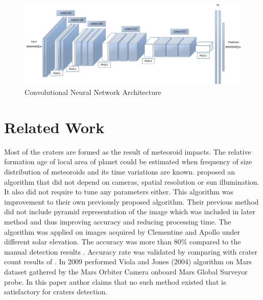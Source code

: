 \documentclass[11pt]{article}
\begin{document}
\begin{figure}[H]
	\centering
	\includegraphics[width=\linewidth]{files/cnn_architecture/arch.png}
	\caption{Convolutional Neural Network Architecture \cite{2016face}}
	\label{fig: CNN architecture}
\end{figure}




\section{Related Work}
Most of the craters are formed as the result of meteoroid impacts. The relative formation age of local area of planet could be estimated when frequency of size distribution of meteoroids and its time variations are known. \cite{sawabe_2006} proposed an algorithm that did not depend on cameras, spatial resolution or sun illumination. It also did not require to tune any parameters either. This algorithm was improvement to their own previously proposed algorithm. Their previous method did not include pyramid representation of the image which was included in later method and thus improving accuracy and reducing processing time. The algorithm was applied on images acquired by Clementine and Apollo under different solar elevation. The accuracy was more than 80\% compared to the manual detection results \cite{sawabe_2006}. Accuracy rate was validated by comparing with crater count results of \cite{neukum1975cratering}. In 2009 \cite{martins2009crater} performed Viola and Jones (2004) algorithm on Mars dataset gathered by the Mars Orbiter Camera onboard Mars Global Surveyor probe. In this paper author claims that no such method existed that is satisfactory for craters detection.
\end{document}

